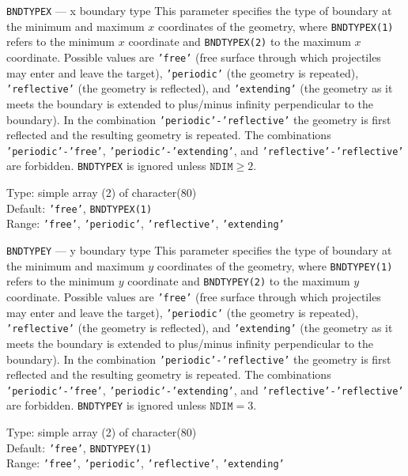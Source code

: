 \begin{keydescription}{\texttt{BNDTYPEX} --- x boundary type}
%
  This parameter specifies the type of boundary at the minimum and maximum $x$
  coordinates of the geometry, where \texttt{BNDTYPEX(1)} refers to the minimum
  $x$ coordinate and \texttt{BNDTYPEX(2)} to the maximum $x$ coordinate.
  Possible values are \texttt{'free'} (free surface through which projectiles
  may enter and leave the target), \texttt{'periodic'} (the geometry is 
  repeated), \texttt{'reflective'} (the geometry is reflected), and 
  \texttt{'extending'} (the geometry as it meets the boundary is extended to 
  plus/minus infinity perpendicular to the boundary). In the combination
  \texttt{'periodic'-'reflective'} the geometry is first reflected 
  and the resulting geometry is repeated. The combinations 
  \texttt{'periodic'-'free'}, \texttt{'periodic'-'extending'}, 
  and \texttt{'reflective'-'reflective'} are forbidden. \texttt{BNDTYPEX} 
  is ignored unless $\texttt{NDIM} \ge 2$.  
  \begin{keytab}
    Type:    \> simple array (2) of character(80) \\
    Default: \> \texttt{'free'}, \texttt{BNDTYPEX(1)} \\
    Range:   \> \texttt{'free'}, \texttt{'periodic'}, \texttt{'reflective'}, 
                \texttt{'extending'} 
  \end{keytab}
\end{keydescription}

\begin{keydescription}{\texttt{BNDTYPEY} --- y boundary type}
%
  This parameter specifies the type of boundary at the minimum and maximum $y$
  coordinates of the geometry, where \texttt{BNDTYPEY(1)} refers to the minimum
  $y$ coordinate and \texttt{BNDTYPEY(2)} to the maximum $y$ coordinate.
  Possible values are \texttt{'free'} (free surface through which projectiles
  may enter and leave the target), \texttt{'periodic'} (the geometry is 
  repeated), \texttt{'reflective'} (the geometry is reflected), and 
  \texttt{'extending'} (the geometry as it meets the boundary is extended to 
  plus/minus infinity perpendicular to the boundary). In the combination
  \texttt{'periodic'-'reflective'} the geometry is first reflected 
  and the resulting geometry is repeated. The combinations 
  \texttt{'periodic'-'free'}, \texttt{'periodic'-'extending'}, 
  and \texttt{'reflective'-'reflective'} are forbidden. \texttt{BNDTYPEY} 
  is ignored unless $\texttt{NDIM} = 3$.  
  \begin{keytab}
    Type:    \> simple array (2) of character(80) \\
    Default: \> \texttt{'free'}, \texttt{BNDTYPEY(1)} \\
    Range:   \> \texttt{'free'}, \texttt{'periodic'}, \texttt{'reflective'}, 
                \texttt{'extending'} 
  \end{keytab}
\end{keydescription}

